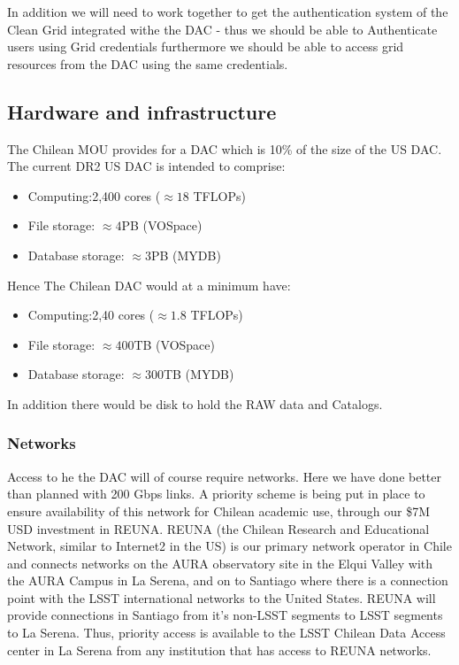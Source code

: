 In addition we will need to work together to get the authentication system of the Clean Grid integrated withe the DAC - thus we should be able to Authenticate users using Grid credentials furthermore we should be able to access grid resources from the DAC using the same credentials.


\subsection{Hardware and infrastructure}
The Chilean MOU provides for a DAC which is 10\% of the size of the US DAC. The current DR2 US DAC is intended to comprise:
\begin{itemize}
\item Computing:2,400 cores ($\approx 18$ TFLOPs)
\item File storage: $\approx 4 $PB  (VOSpace)
\item Database storage: $\approx 3 $PB (MYDB)

\end{itemize}

Hence The Chilean DAC would at a minimum have:
\begin{itemize}
\item Computing:2,40 cores ($\approx 1.8$ TFLOPs)
\item File storage: $\approx 400 $TB  (VOSpace)
\item Database storage: $\approx 300 $TB (MYDB)

\end{itemize}

In addition there would be disk to hold the RAW data and Catalogs.

\subsubsection{Networks}
Access to he the DAC will of course require networks. Here we have done better than planned with 200 Gbps links.
A priority scheme is being put in place to ensure availability of this network  for Chilean academic use, through our  \$7M USD investment in REUNA.
REUNA (the Chilean Research and Educational Network, similar to Internet2 in the US) is our primary network operator in Chile and connects networks on the AURA observatory site in the Elqui Valley with the AURA Campus in La Serena, and on to Santiago where there is a connection point with the LSST international networks to the United States.
REUNA will provide connections in Santiago from it’s non-LSST segments to LSST segments to La Serena. Thus, priority access is available to the LSST Chilean Data Access center in La Serena from any institution that has access to REUNA networks.

